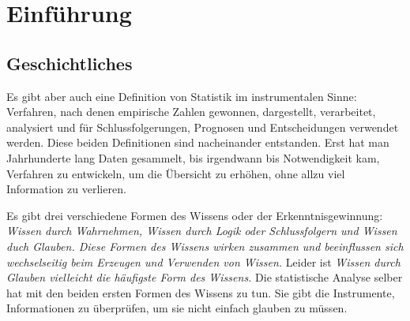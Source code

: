 \chapter{Einführung}
\section{Geschichtliches}
Es gibt aber auch eine Definition von Statistik im instrumentalen Sinne: Verfahren, nach denen empirische Zahlen gewonnen, dargestellt, verarbeitet, analysiert und für Schlussfolgerungen, Prognosen und Entscheidungen verwendet werden.
\newline \newline
Diese beiden Definitionen sind nacheinander entstanden. Erst hat man Jahrhunderte lang Daten gesammelt, bis irgendwann bis Notwendigkeit kam, Verfahren zu entwickeln, um die Übersicht zu erhöhen, ohne allzu viel Information zu verlieren.


Es gibt drei verschiedene Formen des Wissens oder der Erkenntnisgewinnung: \textit{Wissen durch Wahrnehmen, Wissen durch Logik oder Schlussfolgern und Wissen duch Glauben. Diese Formen des Wissens wirken zusammen und beeinflussen sich wechselseitig beim Erzeugen und Verwenden von Wissen.} Leider ist \textit{Wissen durch Glauben vielleicht die häufigste Form des Wissens.}
\newline
Die statistische Analyse selber hat mit den beiden ersten Formen des Wissens zu tun. Sie gibt die Instrumente, Informationen zu überprüfen, um sie nicht einfach glauben zu müssen.

